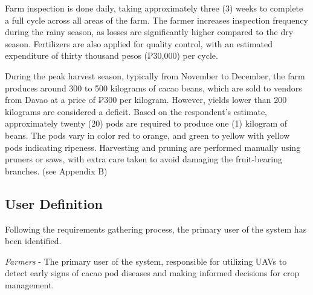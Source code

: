 Farm inspection is done daily, taking approximately three (3) weeks to complete a full cycle across all areas of the farm. The farmer increases inspection frequency during the rainy season, as losses are significantly higher compared to the dry season. Fertilizers are also applied for quality control, with an estimated expenditure of thirty thousand pesos (₱30,000) per cycle.

During the peak harvest season, typically from November to December, the farm produces around 300 to 500 kilograms of cacao beans, which are sold to vendors from Davao at a price of ₱300 per kilogram. However, yields lower than 200 kilograms are considered a deficit. Based on the respondent’s estimate, approximately twenty (20) pods are required to produce one (1) kilogram of beans. The pods vary in color red to orange, and green to yellow with yellow pods indicating ripeness. Harvesting and pruning are performed manually using pruners or saws, with extra care taken to avoid damaging the fruit-bearing branches. (see Appendix B)

\subsection*{User Definition}

Following the requirements gathering process, the primary user of the system has been identified.

\textit{Farmers} - The primary user of the system, responsible for utilizing UAVs to detect early signs of cacao pod diseases and making informed decisions for crop management.

